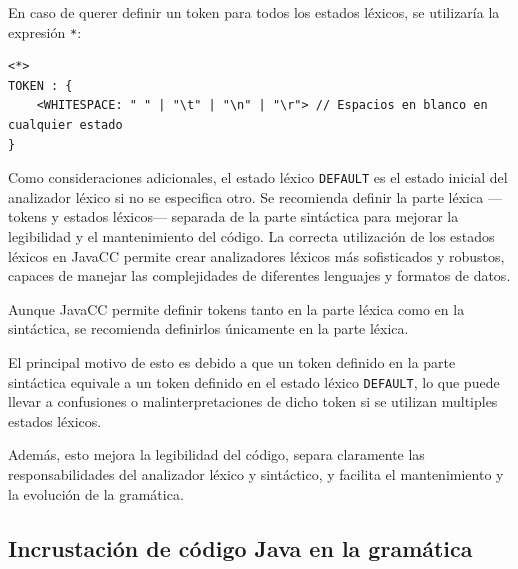 En caso de querer definir un token para todos los estados léxicos, se utilizaría la expresión \lstinline|*|:

\lstset{inputencoding=utf8/latin1}
\begin{lstlisting}
<*>
TOKEN : {
	<WHITESPACE: " " | "\t" | "\n" | "\r"> // Espacios en blanco en cualquier estado
}
\end{lstlisting}

Como consideraciones adicionales, el estado léxico \lstinline|DEFAULT| es el estado inicial del analizador léxico si no se especifica otro.
Se recomienda definir la parte léxica ---tokens y estados léxicos--- separada de la parte sintáctica para mejorar la legibilidad y el mantenimiento del código.
La correcta utilización de los estados léxicos en JavaCC permite crear analizadores léxicos más sofisticados y robustos, capaces de manejar las complejidades de diferentes lenguajes y formatos de datos.


Aunque JavaCC permite definir tokens tanto en la parte léxica como en la sintáctica, se recomienda definirlos únicamente en la parte léxica. 

El principal motivo de esto es debido a que un token definido en la parte sintáctica equivale a un token definido en el estado léxico \lstinline{DEFAULT}, lo que puede llevar a confusiones o malinterpretaciones de dicho token si se utilizan multiples estados léxicos.

Además, esto mejora la legibilidad del código, separa claramente las responsabilidades del analizador léxico y sintáctico, y facilita el mantenimiento y la evolución de la gramática.

\subsection{Incrustación de código Java en la gramática}


